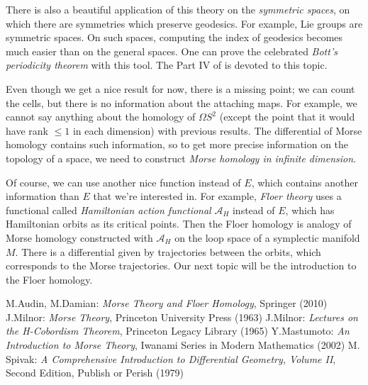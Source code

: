 \documentclass{article}
\newcommand{\A}{\mathcal{A}}
\newcommand{\Om}{\Omega}
\begin{document}
There is also a beautiful application of this theory on the \emph{symmetric spaces}, on which there are symmetries which preserve geodesics.
For example, Lie groups are symmetric spaces.
On such spaces, computing the index of geodesics becomes much easier than on the general spaces.
One can prove the celebrated \emph{Bott's periodicity theorem} with this tool.
The Part IV of \cite{m1} is devoted to this topic.

Even though we get a nice result for now, there is a missing point; we can count the cells, but there is no information about the attaching maps.
For example, we cannot say anything about the homology of $\Om S^2$ (except the point that it would have rank $\leq 1$ in each dimension) with previous results.
The differential of Morse homology contains such information, so to get more precise information on the topology of a space, we need to construct \emph{Morse homology in infinite dimension}.

Of course, we can use another nice function instead of $E$, which contains another information than $E$ that we're interested in.
For example, \emph{Floer theory} uses a functional called \emph{Hamiltonian action functional} $\A_H$ instead of $E$, which has Hamiltonian orbits as its critical points.
Then the Floer homology is analogy of Morse homology constructed with $\A_H$ on the loop space of a symplectic manifold $M$.
There is a differential given by trajectories between the orbits, which corresponds to the Morse trajectories. 
Our next topic will be the introduction to the Floer homology.












\newpage
\begin{thebibliography}{99}
 M.Audin, M.Damian: \emph{Morse Theory and Floer Homology}, Springer (2010)
 J.Milnor: \emph{Morse Theory}, Princeton University Press (1963)
 J.Milnor: \emph{Lectures on the H-Cobordism Theorem}, Princeton Legacy Library (1965)
 Y.Mastumoto: \emph{An Introduction to Morse Theory}, Iwanami Series in Modern Mathematics (2002)
 M. Spivak: \emph{A Comprehensive Introduction to Differential Geometry, Volume II}, Second Edition, Publish or Perish (1979)
\end{thebibliography}
\end{document}
